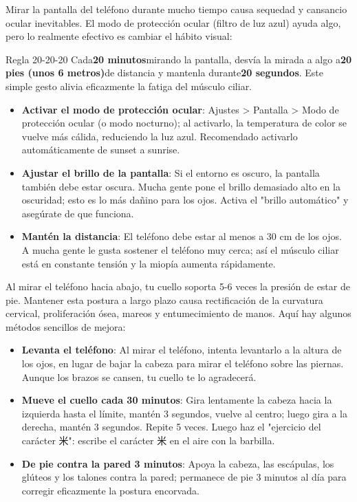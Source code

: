 
Mirar la pantalla del teléfono durante mucho tiempo causa sequedad y cansancio ocular inevitables. El modo de protección ocular (filtro de luz azul) ayuda algo, pero lo realmente efectivo es cambiar el hábito visual:

\begin{tcbinfo}{Regla 20-20-20}
Cada\textbf{20 minutos}mirando la pantalla, desvía la mirada a algo a\textbf{20 pies (unos 6 metros)}de distancia y mantenla durante\textbf{20 segundos}. Este simple gesto alivia eficazmente la fatiga del músculo ciliar.

\end{tcbinfo}

\begin{itemize}
  \item \textbf{Activar el modo de protección ocular}: Ajustes > Pantalla > Modo de protección ocular (o modo nocturno); al activarlo, la temperatura de color se vuelve más cálida, reduciendo la luz azul. Recomendado activarlo automáticamente de sunset a sunrise.
  \item \textbf{Ajustar el brillo de la pantalla}: Si el entorno es oscuro, la pantalla también debe estar oscura. Mucha gente pone el brillo demasiado alto en la oscuridad; esto es lo más dañino para los ojos. Activa el "brillo automático" y asegúrate de que funciona.
  \item \textbf{Mantén la distancia}: El teléfono debe estar al menos a 30 cm de los ojos. A mucha gente le gusta sostener el teléfono muy cerca; así el músculo ciliar está en constante tensión y la miopía aumenta rápidamente.
\end{itemize}


Al mirar el teléfono hacia abajo, tu cuello soporta 5-6 veces la presión de estar de pie. Mantener esta postura a largo plazo causa rectificación de la curvatura cervical, proliferación ósea, mareos y entumecimiento de manos. Aquí hay algunos métodos sencillos de mejora:

\begin{itemize}
  \item \textbf{Levanta el teléfono}: Al mirar el teléfono, intenta levantarlo a la altura de los ojos, en lugar de bajar la cabeza para mirar el teléfono sobre las piernas. Aunque los brazos se cansen, tu cuello te lo agradecerá.
  \item \textbf{Mueve el cuello cada 30 minutos}: Gira lentamente la cabeza hacia la izquierda hasta el límite, mantén 3 segundos, vuelve al centro; luego gira a la derecha, mantén 3 segundos. Repite 5 veces. Luego haz el "ejercicio del carácter 米": escribe el carácter 米 en el aire con la barbilla.
  \item \textbf{De pie contra la pared 3 minutos}: Apoya la cabeza, las escápulas, los glúteos y los talones contra la pared; permanece de pie 3 minutos al día para corregir eficazmente la postura encorvada.
\end{itemize}

